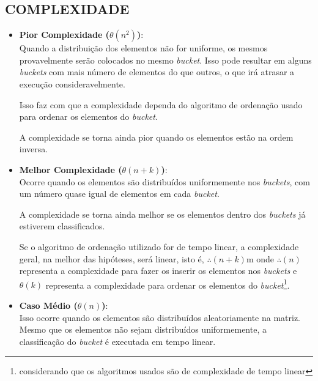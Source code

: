 	\subsection{\normalsize COMPLEXIDADE}
		\begin{itemize}
			\item \textbf{Pior Complexidade ($\theta(n^{2})$)}:\\
				Quando a distribuição dos elementos não for uniforme, os mesmos provavelmente serão colocados no mesmo \textit{bucket}. Isso pode resultar em alguns \textit{buckets} com mais número de elementos do que outros, o que irá atrasar a execução consideravelmente.
				
				Isso faz com que a complexidade dependa do algoritmo de ordenação usado para ordenar os elementos do \textit{bucket}.
				
				A complexidade se torna ainda pior quando os elementos estão na ordem inversa.
			
			\item \textbf{Melhor Complexidade ($\theta(n + k)$)}:\\
				Ocorre quando os elementos são distribuídos uniformemente nos \textit{buckets}, com um número quase igual de elementos em cada \textit{bucket}.
				
				A complexidade se torna ainda melhor se os elementos dentro dos \textit{buckets} já estiverem classificados.

				Se o algoritmo de ordenação utilizado for de tempo linear, a complexidade geral, na melhor das hipóteses, será linear, isto é, $\therefore(n + k)$m onde $\therefore(n)$ representa a complexidade para fazer os inserir os elementos nos \textit{buckets} e $\theta(k)$ representa a complexidade para ordenar os elementos do \textit{bucket}\footnote{considerando que os algoritmos usados são de complexidade de tempo linear}.
				
			\item \textbf{Caso Médio ($\theta(n)$)}:\\
				Isso ocorre quando os elementos são distribuídos aleatoriamente na matriz. Mesmo que os elementos não sejam distribuídos uniformemente, a classificação do \textit{bucket} é executada em tempo linear.
		\end{itemize}